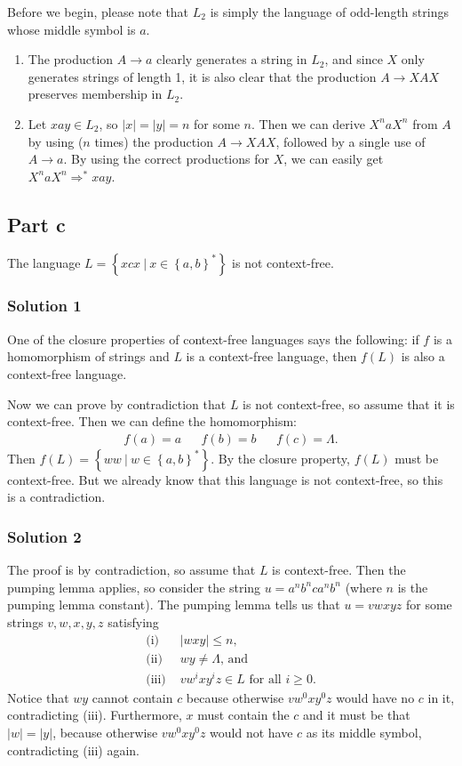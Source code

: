 \documentclass[12pt]{article}
\newcommand{\set}[1]{\left\{#1\right\}}
\newcommand{\Set}[2]{\set{#1\ |\ #2}}
\newcommand{\yields}{\Rightarrow}
\begin{document}
    Before we begin, please note that $L_2$ is simply the language of odd-length strings whose middle symbol is $a$.
    \begin{enumerate}
      \item %
        The production $A\to a$ clearly generates a string in $L_2$, and since $X$ only generates strings of length 1, it is also clear that the production $A\to XAX$ preserves membership in $L_2$.
      \item %
        Let $xay\in L_2$, so $|x|=|y|=n$ for some $n$. Then we can derive $X^naX^n$ from $A$ by using ($n$ times) the production $A\to XAX$, followed by a single use of $A\to a$. By using the correct productions for $X$, we can easily get $X^naX^n\yields^*xay$.
    \end{enumerate}
  \subsection{Part c}
    The language $L=\Set{xcx}{x\in\set{a,b}^*}$ is not context-free.
    \subsubsection{Solution 1}
      One of the closure properties of context-free languages says the following: if $f$ is a homomorphism of strings and $L$ is a context-free language, then $f(L)$ is also a context-free language.

      Now we can prove by contradiction that $L$ is not context-free, so assume that it is context-free. Then we can define the homomorphism:
      \begin{align*}
        f(a)=a && f(b) = b && f(c)=\Lambda.
      \end{align*}
      Then $f(L)=\Set{ww}{w\in\set{a,b}^*}$. By the closure property, $f(L)$ must be context-free. But we already know that this language is not context-free, so this is a contradiction.
    \subsubsection{Solution 2}
      The proof is by contradiction, so assume that $L$ is context-free. Then the pumping lemma applies, so consider the string $u=a^nb^nca^nb^n$ (where $n$ is the pumping lemma constant). The pumping lemma tells us that $u=vwxyz$ for some strings $v,w,x,y,z$ satisfying
      \begin{align*}
        \text{(i) }   &\text{$|wxy|\leq n$,} \\
        \text{(ii) }  &\text{$wy\neq\Lambda$, and} \\
        \text{(iii) } &\text{$vw^ixy^iz\in L$ for all $i\geq0$.}
      \end{align*}
      Notice that $wy$ cannot contain $c$ because otherwise $vw^0xy^0z$ would have no $c$ in it, contradicting (iii). Furthermore, $x$ must contain the $c$ and it must be that $|w|=|y|$, because otherwise $vw^0xy^0z$ would not have $c$ as its middle symbol, contradicting (iii) again.
\end{document}
